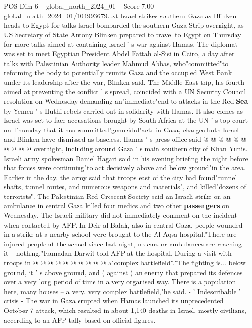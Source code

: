 \begin{textsample}{POS Dim 6 – global\_north\_2024\_01 – Score 7.00 – global\_north\_2024\_01/104993679.txt}  \label{ex:f6_pos_118}
Israel strikes southern Gaza as Blinken heads to Egypt for talks Israel bombarded the southern Gaza Strip overnight, as US Secretary of State Antony Blinken prepared to travel to Egypt on Thursday for more talks aimed at containing Israel ' s war against Hamas.
The diplomat was set to meet Egyptian President Abdel Fattah al-Sisi in Cairo, a day after talks with Palestinian Authority leader Mahmud Abbas, who"committed"to reforming the body to potentially reunite Gaza and the occupied West Bank under its leadership after the war, Blinken said.
The Middle East trip, his fourth aimed at preventing the conflict ' s spread, coincided with a UN Security Council resolution on Wednesday demanding an"immediate"end to attacks in the Red \textbf{Sea} by Yemen ' s Huthi rebels carried out in solidarity with Hamas.
It also comes as Israel was set to face accusations brought by South Africa at the UN ' s top court on Thursday that it has committed"genocidal"acts in Gaza, charges both Israel and Blinken have dismissed as baseless.
Hamas ' s press office said @ @ @ @ @ @ @ @ @ @ overnight, including around Gaza ' s main southern city of Khan Yunis.
Israeli army spokesman Daniel Hagari said in his evening briefing the night before that forces were continuing"to act decisively above and below ground"in the area.
Earlier in the day, the army said that troops east of the city had found"tunnel shafts, tunnel routes, and numerous weapons and materials", and killed"dozens of terrorists".
The Palestinian Red Crescent Society said an Israeli strike on an ambulance in central Gaza killed four medics and two other \textbf{passengers} on Wednesday.
The Israeli military did not immediately comment on the incident when contacted by AFP.
In Deir al-Balah, also in central Gaza, people wounded in a strike at a nearby school were brought to the Al-Aqsa hospital."There are injured people at the school since last night, no cars or ambulances are reaching it -- nothing,"Ramadan Darwit told AFP at the hospital.
During a visit with troops in @ @ @ @ @ @ @ @ @ @ a"complex battlefield"."The fighting is... below ground, it ' s above ground, and ( against ) an enemy that prepared its defences over a very long period of time in a very organised way.
There is a population here, many houses -- a very, very complex battlefield,"he said. - ' Indescribable ' crisis - The war in Gaza erupted when Hamas launched its unprecedented October 7 attack, which resulted in about 1,140 deaths in Israel, mostly civilians, according to an AFP tally based on official figures.

\end{textsample}
